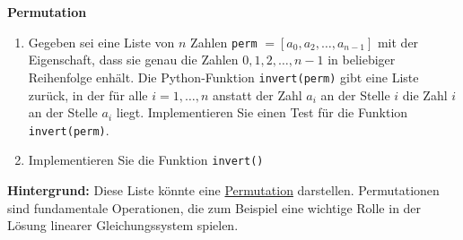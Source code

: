\textbf{Permutation}
\begin{enumerate}
	\item Gegeben sei eine Liste von $n$ Zahlen \verb|perm| $=[a_0, a_2, \dots, a_{n-1}]$ mit der Eigenschaft, dass sie genau die Zahlen $0, 1, 2, \dots, n-1$ in beliebiger Reihenfolge enhält. Die Python-Funktion \verb|invert(perm)| gibt eine Liste zurück, in der für alle $i = 1,\dots,n$ anstatt der Zahl $a_i$ an der Stelle $i$ die Zahl $i$ an der Stelle $a_i$ liegt. Implementieren Sie einen Test für die Funktion \verb|invert(perm)|.
	\item Implementieren Sie die Funktion \verb|invert()|
\end{enumerate}

\textbf{Hintergrund: } Diese Liste könnte eine \hyperref{https://de.wikipedia.org/wiki/Permutation#Definition}{}{}{Permutation} darstellen. Permutationen sind fundamentale Operationen, die zum Beispiel eine wichtige Rolle in der Lösung linearer Gleichungssystem spielen. \\
